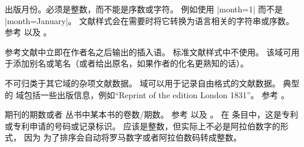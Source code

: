 \begin{fieldlist}

出版月份。必须是整数，而不能是序数或字符。
例如使用 |month={1}| 而不是 |month={January}|。
文献样式会在需要时将它转换为语言相关的字符串或序数。
参考  以及 。




参考文献中立即在作者名之后输出的插入语。
标准文献样式中不使用。
该域可用于添加别名或笔名（或者给出原名，如果作者的化名更熟知的话）。




不可归类于其它域的杂项文献数据。
 域可以用于记录自由格式的文献数据。
典型的  域包括一些出版信息，例如“Reprint of the edition London 1831”。
参考 。




期刊的期数或者  丛书中某本书的卷数\slash 期数。
参考  以及 。
在  条目中，这是专利或专利申请的号码或记录标识。
应该是整数，但实际上不必是阿拉伯数字的形式，
因为 \biber 为了排序会自动将罗马数字或者阿拉伯数码转成整数。


\end{fieldlist}
